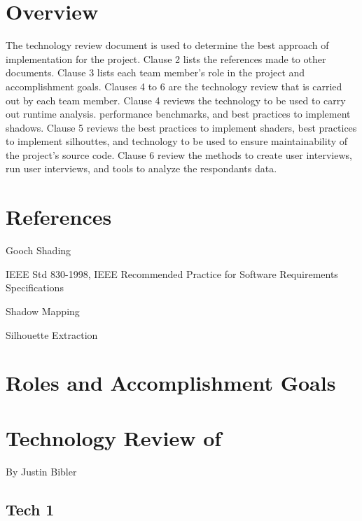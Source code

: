 \documentclass[10pt,journal,compsoc,draftclsnofoot]{IEEEtran}
\begin{document}
\begin{flushleft}

\section{Overview}
\vspace{3mm}
The technology review document is used to determine the best approach of implementation for the project. 
Clause 2 lists the references made to other documents.
Clause 3 lists each team member's role in the project and accomplishment goals.
Clauses 4 to 6 are the technology review that is carried out by each team member.
Clause 4 reviews the technology to be used to carry out runtime analysis. performance benchmarks, and best practices to implement shadows.
Clause 5 reviews the best practices to implement shaders, best practices to implement silhouttes, and technology to be used to ensure maintainability of the project's source code.
Clause 6 review the methods to create user interviews, run user interviews, and tools to analyze the respondants data.

\section{References}
\vspace{3mm}

Gooch Shading 
\vspace{3mm}

IEEE Std 830-1998, IEEE Recommended Practice for Software Requirements Specifications 
\vspace{3mm}

Shadow Mapping 
\vspace{3mm}

Silhouette Extraction 

\newpage

\section{Roles and Accomplishment Goals}

\newpage

\section{Technology Review of}
\large{By Justin Bibler}

\subsection{Tech 1}


\end{flushleft}
\end{document}
